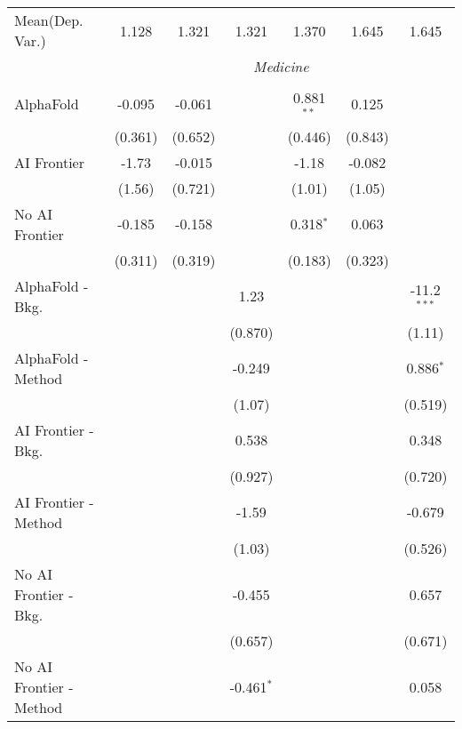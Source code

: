 \begin{tabular}{lcccccc}
Mean(Dep. Var.) & 1.128 & 1.321 & 1.321 & 1.370 & 1.645 & 1.645 \\
 & \multicolumn{6}{c}{\textit{Medicine}} \\ \\
   AlphaFold               & -0.095  & -0.061  &              & 0.881$^{**}$ & 0.125   &   \\   
                           & (0.361) & (0.652) &              & (0.446)      & (0.843) &   \\   
   AI Frontier             & -1.73   & -0.015  &              & -1.18        & -0.082  &   \\   
                           & (1.56)  & (0.721) &              & (1.01)       & (1.05)  &   \\   
   No AI Frontier          & -0.185  & -0.158  &              & 0.318$^{*}$  & 0.063   &   \\   
                           & (0.311) & (0.319) &              & (0.183)      & (0.323) &   \\   
   AlphaFold - Bkg.        &         &         & 1.23         &              &         & -11.2$^{***}$\\   
                           &         &         & (0.870)      &              &         & (1.11)\\   
   AlphaFold - Method      &         &         & -0.249       &              &         & 0.886$^{*}$\\   
                           &         &         & (1.07)       &              &         & (0.519)\\   
   AI Frontier - Bkg.      &         &         & 0.538        &              &         & 0.348\\   
                           &         &         & (0.927)      &              &         & (0.720)\\   
   AI Frontier - Method    &         &         & -1.59        &              &         & -0.679\\   
                           &         &         & (1.03)       &              &         & (0.526)\\   
   No AI Frontier - Bkg.   &         &         & -0.455       &              &         & 0.657\\   
                           &         &         & (0.657)      &              &         & (0.671)\\   
   No AI Frontier - Method &         &         & -0.461$^{*}$ &              &         & 0.058\\   

\end{tabular}
